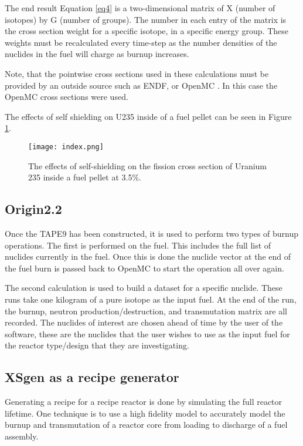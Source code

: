 \documentclass{article}
\begin{document}
The end result Equation \ref{eq4} is a two-dimensional matrix of X (number of isotopes) by G (number of groups). The number in each entry of the matrix is the cross section weight for a specific isotope, in a specific energy group. These weights must be recalculated every time-step as the number densities of the nuclides in the fuel will charge as burnup increases.

Note, that the pointwise cross sections used in these calculations must be provided by an outside source such as ENDF\cite{endf}, or OpenMC \cite{openmc}. In this case the OpenMC cross sections were used.

The effects of self shielding on U235 inside of a fuel pellet can be seen in Figure \ref{fig:index}.
\begin{figure}[h]
  \center
  \texttt{[image: index.png]}
  \caption{The effects of self-shielding on the fission cross section of Uranium 235 inside a fuel pellet at 3.5\%.}
  \label{fig:index}
\end{figure}

\subsection{Origin2.2}
Once the TAPE9 has been constructed, it is used to perform two types of burnup operations. The first is performed on the fuel. This includes the full list of nuclides currently in the fuel. Once this is done the nuclide vector at the end of the fuel burn is passed back to OpenMC to start the operation all over again.

The second calculation is used to build a dataset for a specific nuclide. These runs take one kilogram of a pure isotope as the input fuel. At the end of the run, the burnup, neutron production/destruction, and transmutation matrix are all recorded. The nuclides of interest are chosen ahead of time by the user of the software, these are the nuclides that the user wishes to use as the input fuel for the reactor type/design that they are investigating.

\subsection{XSgen as a recipe generator}
Generating a recipe for a recipe reactor is done by simulating the full reactor lifetime. One technique is to use a high fidelity model to accurately model the burnup and transmutation of a reactor core from loading to discharge of a fuel assembly.
\end{document}

